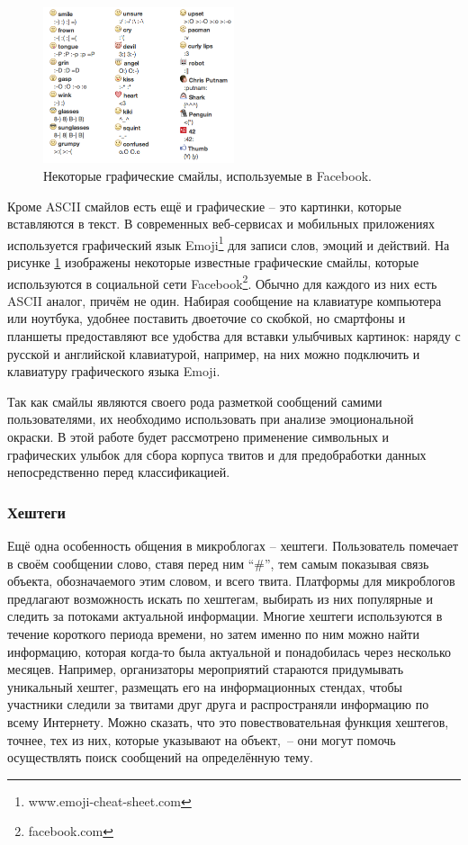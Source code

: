 \begin{figure}[h]
\centering
\includegraphics[width=0.5\textwidth]{ListofFacebookChatEmoji}
\caption{Некоторые графические смайлы, используемые в Facebook.}
\label{emoji}
\end{figure}

\pagebreak
Кроме ASCII смайлов есть ещё и графические -- это картинки, которые вставляются в текст. В
современных веб-сервисах и мобильных приложениях используется графический язык Emoji\footnote{www.emoji-cheat-sheet.com} для
записи слов, эмоций и действий. На рисунке \ref{emoji} изображены некоторые известные графические
смайлы, которые используются в социальной сети Facebook\footnote{facebook.com}. Обычно для
каждого из них есть ASCII аналог, причём не один. Набирая сообщение на клавиатуре компьютера или
ноутбука, удобнее поставить двоеточие со скобкой, но смартфоны и планшеты предоставляют все удобства
для вставки улыбчивых картинок: наряду с русской и английской клавиатурой, например, на них можно
подключить и клавиатуру графического языка Emoji.

Так как смайлы являются своего рода разметкой сообщений самими пользователями, их необходимо
использовать при анализе эмоциональной окраски. В этой работе будет рассмотрено применение
символьных и графических улыбок для сбора корпуса твитов и для предобработки данных непосредственно
перед классификацией.

\subsubsection{Хештеги}

Ещё одна особенность общения в микроблогах -- хештеги. Пользователь помечает в своём сообщении
слово, ставя перед ним ``\#'', тем самым показывая связь объекта, обозначаемого этим словом, и всего
твита. Платформы для микроблогов предлагают возможность искать по хештегам, выбирать из них
популярные и следить за потоками актуальной информации. Многие хештеги используются в течение
короткого периода времени, но затем именно по ним можно найти информацию, которая когда-то была
актуальной и понадобилась через несколько месяцев. Например, организаторы мероприятий стараются
придумывать уникальный хештег, размещать его на информационных стендах, чтобы участники следили за
твитами друг друга и распространяли информацию по всему Интернету. Можно сказать, что это
повествовательная функция хештегов, точнее, тех из них, которые указывают на объект,~-- они могут
помочь осуществлять поиск сообщений на определённую тему.

